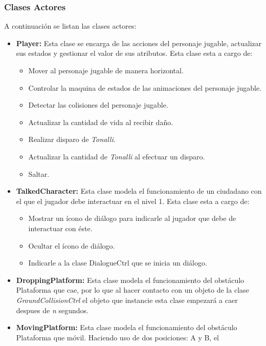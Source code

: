 \subsubsection{Clases Actores}
A continuación se listan las clases actores: 
		\begin{itemize}
			\item \textbf{Player:} Esta clase se encarga de las acciones del personaje 
			jugable, actualizar sus estados y gestionar el valor de sus atributos. 
			Esta clase esta a cargo de:
			\begin{itemize}
				\item Mover al personaje jugable de manera horizontal.
				\item Controlar la maquina de estados de las animaciones del personaje 
				jugable.
				\item Detectar las colisiones del personaje jugable.
				\item Actualizar la cantidad de vida al recibir daño.
				\item Realizar disparo de \textit{Tonalli}.
				\item Actualizar la cantidad de \textit{Tonalli} al efectuar un disparo.  
				\item Saltar. 
			\end{itemize}
			\item \textbf{TalkedCharacter:} Esta clase modela el funcionamiento de un
			ciudadano con el que el jugador debe interactuar en el nivel 1.
			Esta clase esta a cargo de:
			\begin{itemize}
				\item Mostrar un ícono de diálogo para indicarle al jugador que debe de 
				interactuar con éste.
				\item Ocultar el ícono de diálogo.
				\item Indicarle a la clase DialogueCtrl que se inicia un diálogo.  
			\end{itemize}
			\item \textbf{DroppingPlatform:} Esta clase modela el funcionamiento 
			del obstáculo Plataforma que cae, por lo que al hacer contacto con un objeto de 
			la clase \textit{GroundCollisionCtrl} el objeto que instancie esta clase 
			empezará a caer despues de \textit{n} segundos. 
			\item \textbf{MovingPlatform:} Esta clase modela el funcionamiento 
			del obstáculo Plataforma que móvil. Haciendo uso de dos posiciones: A y B, el 

\end{itemize}
